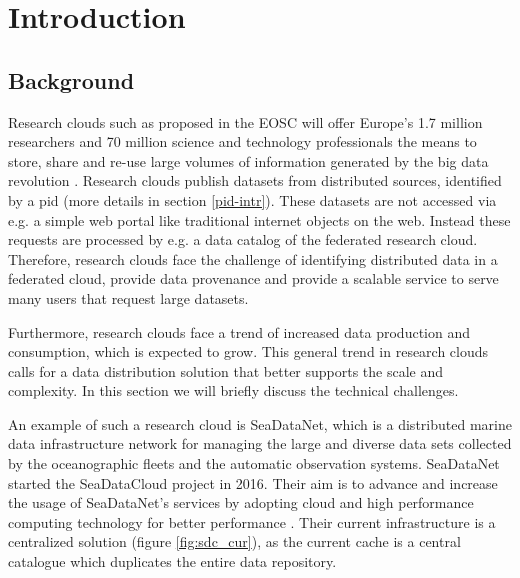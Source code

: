 \section{Introduction}

\subsection{Background}
\label{introduction-background}

Research clouds such as proposed in the EOSC will offer Europe's 1.7 million researchers and 70 million science and technology professionals the means to store, share and re-use large volumes of information generated by the big data revolution \cite{eurocloud}. Research clouds publish datasets from distributed sources, identified by a \gls{pid} (more details in section \ref{pid-intr}). These datasets are not accessed via e.g. a simple web portal like traditional internet objects on the web. Instead these requests are processed by e.g. a data catalog of the federated research cloud. Therefore, research clouds face the challenge of identifying distributed data in a federated cloud, provide data provenance and provide a scalable service to serve many users that request large datasets.

Furthermore, research clouds face a trend of increased data production and consumption, which is expected to grow. This general trend in research clouds calls for a data distribution solution that better supports the scale and complexity. In this section we will briefly discuss the technical challenges.

An example of such a research cloud is SeaDataNet, which is a distributed marine data infrastructure network for managing the large and diverse data sets collected by the oceanographic fleets and the automatic observation systems. SeaDataNet started the SeaDataCloud project in 2016. Their aim is to advance and increase the usage of SeaDataNet's services by adopting cloud and high performance computing technology for better performance \cite{sdc}. Their current infrastructure is a centralized solution (figure \ref{fig:sdc_cur}), as the current cache is a central catalogue which duplicates the entire data repository.


